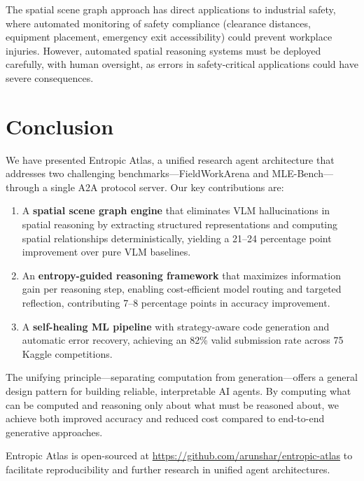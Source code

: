 \documentclass[11pt]{article}
\begin{document}
The spatial scene graph approach has direct applications to industrial safety, where automated monitoring of safety compliance (clearance distances, equipment placement, emergency exit accessibility) could prevent workplace injuries. However, automated spatial reasoning systems must be deployed carefully, with human oversight, as errors in safety-critical applications could have severe consequences.

\section{Conclusion}
\label{sec:conclusion}

We have presented Entropic Atlas, a unified research agent architecture that addresses two challenging benchmarks---FieldWorkArena and MLE-Bench---through a single A2A protocol server. Our key contributions are:

\begin{enumerate}[leftmargin=*,itemsep=2pt]
  \item A \textbf{spatial scene graph engine} that eliminates VLM hallucinations in spatial reasoning by extracting structured representations and computing spatial relationships deterministically, yielding a 21--24 percentage point improvement over pure VLM baselines.
  \item An \textbf{entropy-guided reasoning framework} that maximizes information gain per reasoning step, enabling cost-efficient model routing and targeted reflection, contributing 7--8 percentage points in accuracy improvement.
  \item A \textbf{self-healing ML pipeline} with strategy-aware code generation and automatic error recovery, achieving an 82\% valid submission rate across 75 Kaggle competitions.
\end{enumerate}

The unifying principle---separating computation from generation---offers a general design pattern for building reliable, interpretable AI agents. By computing what can be computed and reasoning only about what must be reasoned about, we achieve both improved accuracy and reduced cost compared to end-to-end generative approaches.

Entropic Atlas is open-sourced at \url{https://github.com/arunshar/entropic-atlas} to facilitate reproducibility and further research in unified agent architectures.
\end{document}
